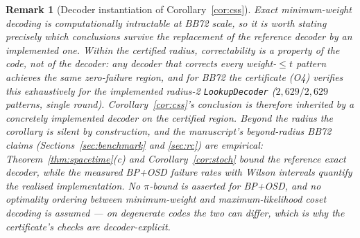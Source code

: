 \documentclass[11pt,a4paper]{article}
\newtheorem{remark}{Remark}
\begin{document}
\begin{remark}[Decoder instantiation of Corollary~\ref{cor:css}]
\label{rem:decoder-inst}
Exact minimum-weight decoding is computationally intractable at BB72
scale, so it is worth stating precisely which conclusions survive the
replacement of the reference decoder by an implemented one.
\emph{Within the certified radius}, correctability is a property of
the code, not of the decoder: any decoder that corrects every
weight-$\le t$ pattern achieves the same zero-failure region, and for
BB72 the certificate (O4) verifies this exhaustively for the
implemented radius-2 \texttt{LookupDecoder} ($2{,}629/2{,}629$
patterns, single round). Corollary~\ref{cor:css}'s conclusion is
therefore inherited by a concretely implemented decoder on the
certified region.
\emph{Beyond the radius} the corollary is silent by construction, and
the manuscript's beyond-radius BB72 claims (Sections~\ref{sec:benchmark}
and \ref{sec:rc}) are empirical: Theorem~\ref{thm:spacetime}(c) and
Corollary~\ref{cor:stoch} bound the reference exact decoder, while the
measured BP+OSD failure rates with Wilson intervals quantify the
realised implementation. No $\pi$-bound is asserted for BP+OSD, and no
optimality ordering between minimum-weight and maximum-likelihood coset
decoding is assumed --- on degenerate codes the two can differ, which is
why the certificate's checks are decoder-explicit.
\end{remark}
\end{document}
